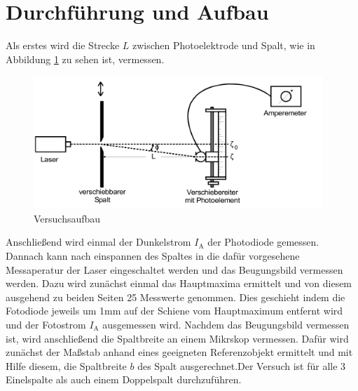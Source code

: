 \section{Durchführung und Aufbau}
\label{sec:Durchführung}
Als erstes wird die Strecke $L$ zwischen Photoelektrode und Spalt, wie in Abbildung \ref{fig:aufbau} zu sehen ist, vermessen.
\begin{figure}
  \centering
  \includegraphics[height=5cm]{picture/Aufbau.png}
  \caption{Versuchsaufbau}
  \label{fig:aufbau}
\end{figure}
Anschließend wird einmal der Dunkelstrom $I_\text{A}$ der Photodiode gemessen. Dannach kann nach einspannen des Spaltes in die dafür vorgesehene Messaperatur der Laser eingeschaltet werden und das Beugungsbild vermessen werden. Dazu wird zunächst einmal das Hauptmaxima ermittelt und von diesem ausgehend zu beiden Seiten 25 Messwerte genommen. Dies geschieht indem die Fotodiode jeweils um 1mm auf der Schiene vom Hauptmaximum entfernt wird und der Fotostrom $I_\text{A}$ ausgemessen wird. 
Nachdem das Beugungsbild vermessen ist, wird anschließend die Spaltbreite an einem Mikrskop vermessen. Dafür wird zunächst der Maßstab anhand eines geeigneten Referenzobjekt ermittelt und mit Hilfe diesem, die Spaltbreite $b$ des Spalt ausgerechnet.Der Versuch ist für alle 3 Einelspalte als auch einem Doppelspalt durchzuführen.
